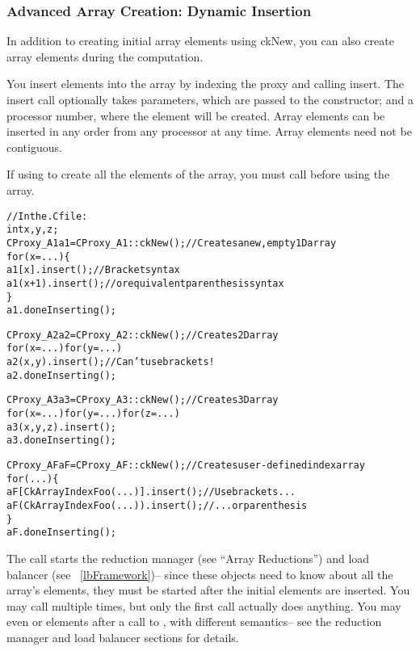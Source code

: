 \subsubsection{Advanced Array Creation: Dynamic Insertion}

\label{dynamic_insertion}

In addition to creating initial array elements using ckNew,
you can also
create array elements during the computation.

You insert elements into the array by indexing the proxy
and calling insert.  The insert call optionally takes 
parameters, which are passed to the constructor; and a
processor number, where the element will be created.
Array elements can be inserted in any order from 
any processor at any time.  Array elements need not 
be contiguous.

If using  to create all the elements of the array,
you must call  before using
the array.

\begin{alltt}
//In the .C file:
int x,y,z;
CProxy_A1 a1=CProxy_A1::ckNew();  //Creates a new, empty 1D array
for (x=...) \{
   a1[x  ].insert();  //Bracket syntax
   a1(x+1).insert();  // or equivalent parenthesis syntax
\}
a1.doneInserting();

CProxy_A2 a2=CProxy_A2::ckNew();   //Creates 2D array
for (x=...) for (y=...)
   a2(x,y).insert();  //Can't use brackets!
a2.doneInserting();

CProxy_A3 a3=CProxy_A3::ckNew();   //Creates 3D array
for (x=...) for (y=...) for (z=...)
   a3(x,y,z).insert();
a3.doneInserting();

CProxy_AF aF=CProxy_AF::ckNew();   //Creates user-defined index array
for (...) \{
   aF[CkArrayIndexFoo(...)].insert(); //Use brackets...
   aF(CkArrayIndexFoo(...)).insert(); //  ...or parenthesis
\}
aF.doneInserting();

\end{alltt}

The  call starts the reduction manager (see ``Array
Reductions'') and load balancer (see ~\ref{lbFramework})-- since
these objects need to know about all the array's elements, they
must be started after the initial elements are inserted.
You may call  multiple times, but only the first
call actually does anything.  You may even  or 
elements after a call to , with different semantics-- 
see the reduction manager and load balancer sections for details.

